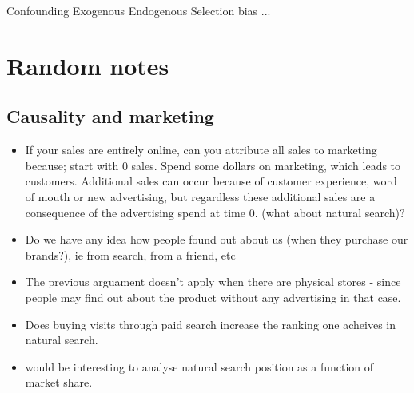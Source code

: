 Confounding
Exogenous
Endogenous
Selection bias
...

\chapter*{Random notes}

\section*{Causality and marketing}
\begin{itemize}
\item If your sales are entirely online, can you attribute all sales to marketing because; start with 0 sales. Spend some dollars on marketing, which leads to customers. Additional sales can occur because of customer experience, word of mouth or new advertising, but regardless these additional sales are a consequence of the advertising spend at time 0. (what about natural search)? 
\item Do we have any idea how people found out about us (when they purchase our brands?), ie from search, from a friend, etc
\item The previous arguament doesn't apply when there are physical stores - since people may find out about the product without any advertising in that case. 
\item Does buying visits through paid search increase the ranking one acheives in natural search. 
\item would be interesting to analyse natural search position as a function of market share. 
\end{itemize}


